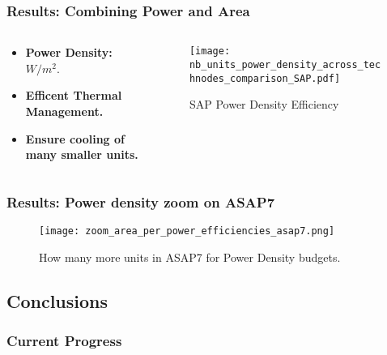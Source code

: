 \begin{frame}
    \frametitle{Results: Combining Power and Area}

    \scriptsize
    \begin{columns}

    \begin{column}{0.5\columnwidth}
        \begin{itemize}
		\item \textbf{Power Density:} $W/m^{2}$.
		\item \textbf{Efficent Thermal Management.}
		\item \textbf{Ensure cooling of many smaller units.}
        \end{itemize}
    \end{column}

    \begin{column}{0.5\textwidth}
        \begin{figure}[H]
            \centering
		\vspace{1mm}
            \texttt{[image: nb\_units\_power\_density\_across\_technodes\_comparison\_SAP.pdf]}
		\vspace{-3mm}
            \caption{SAP Power Density Efficiency}
        \end{figure}
    \end{column}

    \end{columns}

\end{frame}

\begin{frame}
    \frametitle{Results: Power density zoom on ASAP7}

    \tiny
	\begin{figure}[H]
            \centering
            \texttt{[image: zoom\_area\_per\_power\_efficiencies\_asap7.png]}
		\vspace{-2mm}
		\caption{How many more units in ASAP7 for Power Density budgets.}
	\end{figure}

    \normalsize

\end{frame}

\subsection{Conclusions}
\begin{frame}
    \frametitle{Current Progress}

    \tableofcontents[currentsection,
                     subsectionstyle=show/shaded/hide,
                     sectionstyle=show/hide]

\end{frame}

